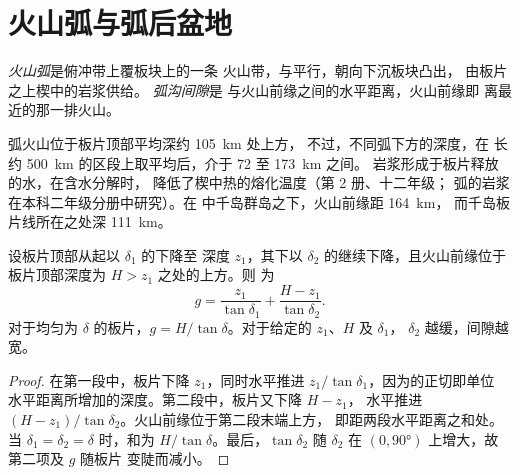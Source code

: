 \section{火山弧与弧后盆地}\label{sec:b1:active-margins:arcs}

\begin{definition}\label{def:b1:active-margins:volcanic-arc}
\emph{火山弧}是俯冲带上覆板块上的一条
火山带，与平行，朝向下沉板块凸出，
由板片之上楔中的岩浆供给。
\emph{弧沟间隙}是
与火山前缘之间的水平距离，火山前缘即
离最近的那一排火山。
\end{definition}

弧火山位于板片顶部平均深约 \qty{105}{km} 处上方，
不过，不同弧下方的深度，在
长约 \qty{500}{km} 的区段上取平均后，介于 72 至 \qty{173}{km} 之间。
岩浆形成于板片释放的水，在含水分解时，
降低了楔中热的熔化温度（第 2 册、十二年级；
弧的岩浆在本科二年级分册中研究）。在
中千岛群岛之下，火山前缘距 \qty{164}{km}，
而千岛板片线所在之处深 \qty{111}{km}。

\begin{proposition}[弧沟间隙]\label{prop:b1:active-margins:gap}
设板片顶部从起以 $\delta_1$ 的下降至
深度 $z_1$，其下以 $\delta_2$ 的继续下降，且火山前缘位于
板片顶部深度为 $H > z_1$ 之处的上方。则
为
\[
  g = \frac{z_1}{\tan\delta_1} + \frac{H - z_1}{\tan\delta_2} .
\]
对于均匀为 $\delta$ 的板片，$g = H/\tan\delta$。对于给定的 $z_1$、$H$
及 $\delta_1$， $\delta_2$ 越缓，间隙越宽。
\end{proposition}

\begin{proof}
在第一段中，板片下降 $z_1$，同时水平推进
$z_1/\tan\delta_1$，因为的正切即单位
水平距离所增加的深度。第二段中，板片又下降 $H - z_1$，
水平推进 $(H - z_1)/\tan\delta_2$。火山前缘位于第二段末端上方，
即距两段水平距离之和处。当 $\delta_1 = \delta_2
= \delta$ 时，和为 $H/\tan\delta$。最后，$\tan\delta_2$ 随
$\delta_2$ 在 $(0, \ang{90})$ 上增大，故第二项及 $g$ 随板片
变陡而减小。
\end{proof}

